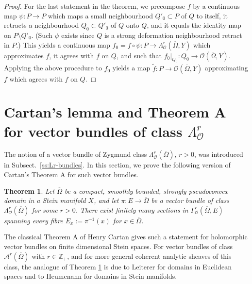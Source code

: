 \documentclass[11pt]{amsart}
\numberwithin{equation}{section}
\newtheorem{theorem}{Theorem}[section]
\theoremstyle{definition}
\newcommand\Ascr{\mathscr{A}}
\newcommand\Oscr{\mathscr{O}}
\newcommand\Z{\mathbb{Z}}
\begin{document}
\begin{proof}
For the last statement in the theorem, we precompose $f$ by a continuous map 
$\psi:P\to P$ which maps a small neighbourhood
$Q'_0\subset P$ of $Q$ to itself, it retracts a neighbourhood
$Q_0\subset Q'_0$ of $Q$ onto $Q$, and it equals the identity map on 
$P\setminus Q'_0$. (Such $\psi$ exists since $Q$ is a strong deformation 
neighbourhood retract in $P$.) This yields a continuous map 
$f_0=f\circ \psi : P\to \Lambda^r_\Oscr(\overline \Omega,Y)$
which approximates $f$, it agrees with $f$ on $Q$, and such that 
$f_0|_{Q_0}:Q_0 \to \Oscr(\overline \Omega,Y)$. Applying the 
above procedure to $f_0$ yields a map 
$\tilde f:P\to \Oscr(\overline \Omega,Y)$ approximating
$f$ which agrees with $f$ on $Q$.
\end{proof}


%
%
%
%
\section{Cartan's lemma and Theorem A for vector bundles of class 
$\Lambda^r_\Oscr$}
\label{sec:vectorbundles}

The notion of a vector bundle of Zygmund class 
$\Lambda^r_\Oscr(\overline\Omega)$, $r>0$, 
was introduced in Subsect.\ \ref{ss:Lr-bundles}. 
In this section, we prove the following version of Cartan's Theorem A for 
such vector bundles. 

%
%
\begin{theorem}\label{th:TheoremA}
Let $\overline \Omega$ be a compact, smoothly bounded, 
strongly pseudoconvex domain in a Stein manifold $X$,  
and let $\pi:E\to \overline \Omega$ be a vector bundle 
of class $\Lambda^r_\Oscr(\overline\Omega)$ for some $r>0$. 
There exist finitely many sections in $\Gamma^r_\Oscr(\overline\Omega,E)$ 
spanning every fibre $E_x:=\pi^{-1}(x)$ for $x\in \overline \Omega$.
\end{theorem}

The classical Theorem A of Henry Cartan gives such a statement 
for holomorphic vector bundles on finite dimensional Stein spaces.
For vector bundles of class $\Ascr^r(\overline\Omega)$ with $r\in\Z_+$,
and for more general coherent analytic sheaves of this class,
the analogue of Theorem \ref{th:TheoremA} is due to 
Leiterer \cite{Leiterer1976II} for domains in Euclidean spaces and
to Heumenann \cite[Theorems 2, 6]{Heunemann1986II} for domains
in Stein manifolds.
\end{document}
